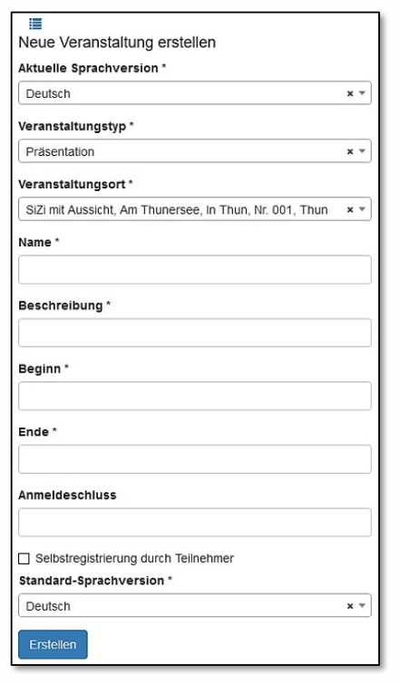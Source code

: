 \begin{figure}   %
  \vspace{-30pt}      %
  \begin{center}
    \includegraphics[width=1\linewidth]{../chapters/10_CRM/pictures/10-2-1_NeueVeranstaltung.jpg}
  \end{center}
  \vspace{-20pt}
  \vspace{-10pt}
\end{figure}

